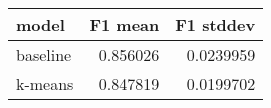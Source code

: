 \begin{tabular}{lrr}
\toprule
 model    &   F1 mean &   F1 stddev \\
\midrule
 baseline &  0.856026 &   0.0239959 \\
 k-means  &  0.847819 &   0.0199702 \\
\bottomrule
\end{tabular}